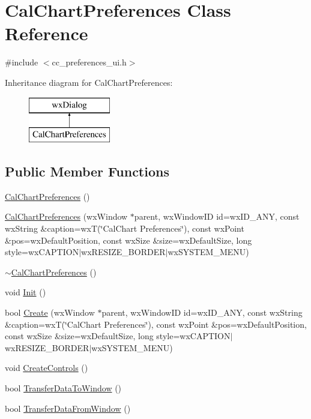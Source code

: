 \hypertarget{a00025}{\section{Cal\-Chart\-Preferences Class Reference}
\label{a00025}
}


{\ttfamily \#include $<$cc\-\_\-preferences\-\_\-ui.\-h$>$}

Inheritance diagram for Cal\-Chart\-Preferences\-:\begin{figure}[H]
\begin{center}
\leavevmode
\includegraphics[height=2.000000cm]{a00025}
\end{center}
\end{figure}
\subsection*{Public Member Functions}
\begin{DoxyCompactItemize}
\item 
\hyperlink{a00025_a291efd287971e243c8735e04635ff74e}{Cal\-Chart\-Preferences} ()
\item 
\hyperlink{a00025_aa6229a327e8d66093267e8ce51293251}{Cal\-Chart\-Preferences} (wx\-Window $\ast$parent, wx\-Window\-I\-D id=wx\-I\-D\-\_\-\-A\-N\-Y, const wx\-String \&caption=wx\-T(\char`\"{}Cal\-Chart Preferences\char`\"{}), const wx\-Point \&pos=wx\-Default\-Position, const wx\-Size \&size=wx\-Default\-Size, long style=wx\-C\-A\-P\-T\-I\-O\-N$\vert$wx\-R\-E\-S\-I\-Z\-E\-\_\-\-B\-O\-R\-D\-E\-R$\vert$wx\-S\-Y\-S\-T\-E\-M\-\_\-\-M\-E\-N\-U)
\item 
\hyperlink{a00025_a2ac7dba36299d96c86e28f00d6dfac8b}{$\sim$\-Cal\-Chart\-Preferences} ()
\item 
void \hyperlink{a00025_aa093e353055f019c450ea79e7dc2c341}{Init} ()
\item 
bool \hyperlink{a00025_a95045856ad97ccd9bdd6121bbfe431d7}{Create} (wx\-Window $\ast$parent, wx\-Window\-I\-D id=wx\-I\-D\-\_\-\-A\-N\-Y, const wx\-String \&caption=wx\-T(\char`\"{}Cal\-Chart Preferences\char`\"{}), const wx\-Point \&pos=wx\-Default\-Position, const wx\-Size \&size=wx\-Default\-Size, long style=wx\-C\-A\-P\-T\-I\-O\-N$\vert$wx\-R\-E\-S\-I\-Z\-E\-\_\-\-B\-O\-R\-D\-E\-R$\vert$wx\-S\-Y\-S\-T\-E\-M\-\_\-\-M\-E\-N\-U)
\item 
void \hyperlink{a00025_ad51bb595a0f8e50375a9fd6e3be251c4}{Create\-Controls} ()
\item 
bool \hyperlink{a00025_acdce6207ef8c3d2523c5a947be8b57ca}{Transfer\-Data\-To\-Window} ()
\item 
bool \hyperlink{a00025_a7403ccca7f36bdbd8a7d1d3067d9a5a7}{Transfer\-Data\-From\-Window} ()
\end{DoxyCompactItemize}
